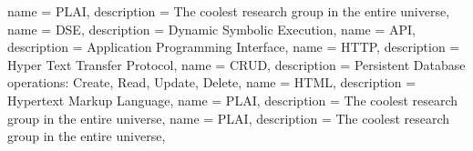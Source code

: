 {
  name = PLAI,
  description = {The coolest research group in the entire universe},
}
{
  name = DSE,
  description = {Dynamic Symbolic Execution},
}
{
  name = API,
  description = {Application Programming Interface},
}
{
  name = HTTP,
  description = {Hyper Text Transfer Protocol},
}
{
  name = CRUD,
  description = {Persistent Database operations: Create, Read, Update, Delete},
}
{
  name = HTML,
  description = {Hypertext Markup Language},
}
{
  name = PLAI,
  description = {The coolest research group in the entire universe},
}
{
  name = PLAI,
  description = {The coolest research group in the entire universe},
}